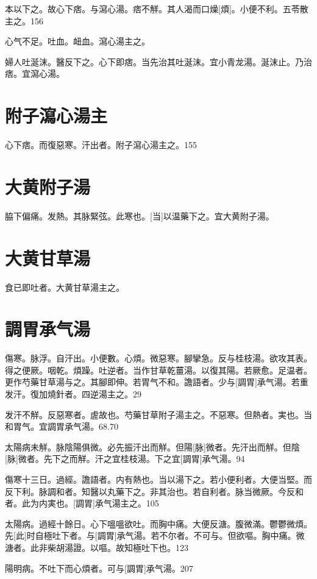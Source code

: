 \documentclass[12pt,twoside,UTF8,b5paper]{ctexbook}
\begin{document}
本以下之。故心下痞。与瀉心湯。痞不觧。其人渴而口燥[煩]。小便不利。五苓散主之。156

心气不足。吐血。衄血。瀉心湯主之。

婦人吐涎沫。醫反下之。心下即痞。当先治其吐涎沫。宜小青龙湯。涎沫止。乃治痞。宜瀉心湯。

\section{附子瀉心湯主}

心下痞。而復惡寒。汗出者。附子瀉心湯主之。155

\section{大黄附子湯}

脇下偏痛。发熱。其脉緊弦。此寒也。[当]以温藥下之。宜大黄附子湯。

\section{大黄甘草湯}

食已即吐者。大黄甘草湯主之。

\section{調胃承气湯}

傷寒。脉浮。自汗出。小便數。心煩。微惡寒。腳攣急。反与桂枝湯。欲攻其表。得之便厥。咽乾。煩躁。吐逆者。当作甘草乾薑湯。以復其陽。若厥愈。足温者。更作芍藥甘草湯与之。其腳即伸。若胃气不和。譫語者。少与[調胃]承气湯。若重发汗。復加燒針者。四逆湯主之。29

发汗不觧。反惡寒者。虗故也。芍藥甘草附子湯主之。不惡寒。但熱者。実也。当和胃气。宜調胃承气湯。68.70

太陽病未觧。脉陰陽俱微。必先振汗出而觧。但陽[脉]微者。先汗出而觧。但陰[脉]微者。先下之而觧。汗之宜桂枝湯。下之宜[調胃]承气湯。94

傷寒十三日。過經。譫語者。内有熱也。当以湯下之。若小便利者。大便当堅。而反下利。脉調和者。知醫以丸藥下之。非其治也。若自利者。脉当微厥。今反和者。此为内実也。[調胃]承气湯主之。105

太陽病。過經十餘日。心下嗢嗢欲吐。而胸中痛。大便反溏。腹微滿。鬱鬱微煩。先[此]时自極吐下者。与[調胃]承气湯。若不尔者。不可与。但欲嘔。胸中痛。微溏者。此非柴胡湯證。以嘔。故知極吐下也。123

陽明病。不吐下而心煩者。可与[調胃]承气湯。207
\end{document}
